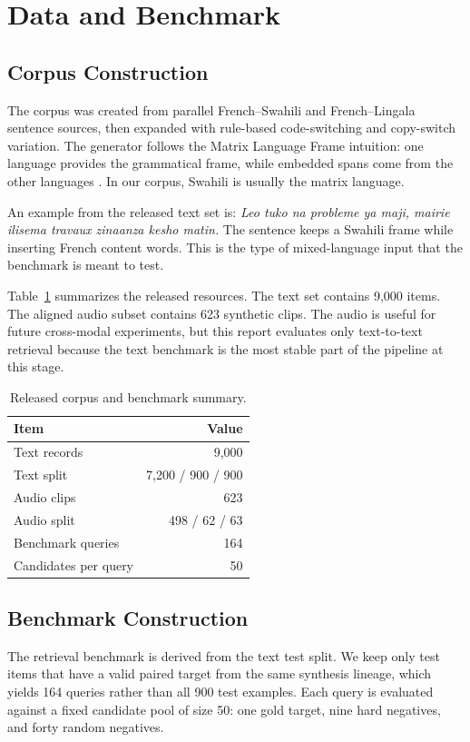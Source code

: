 \documentclass[11pt,twocolumn]{article}
\begin{document}
\section{Data and Benchmark}
\subsection{Corpus Construction}
The corpus was created from parallel French--Swahili and French--Lingala sentence sources, then expanded with rule-based code-switching and copy-switch variation. The generator follows the Matrix Language Frame intuition: one language provides the grammatical frame, while embedded spans come from the other languages \cite{myers-scotton1993}. In our corpus, Swahili is usually the matrix language.

An example from the released text set is: \emph{Leo tuko na probleme ya maji, mairie ilisema travaux zinaanza kesho matin.} The sentence keeps a Swahili frame while inserting French content words. This is the type of mixed-language input that the benchmark is meant to test.

Table~\ref{tab:data} summarizes the released resources. The text set contains 9{,}000 items. The aligned audio subset contains 623 synthetic clips. The audio is useful for future cross-modal experiments, but this report evaluates only text-to-text retrieval because the text benchmark is the most stable part of the pipeline at this stage.

\begin{table}[t]
\centering
\caption{Released corpus and benchmark summary.}
\label{tab:data}
\begin{tabular}{@{}lr@{}}
\toprule
Item & Value \\
\midrule
Text records & 9{,}000 \\
Text split & 7{,}200 / 900 / 900 \\
Audio clips & 623 \\
Audio split & 498 / 62 / 63 \\
Benchmark queries & 164 \\
Candidates per query & 50 \\
\bottomrule
\end{tabular}
\end{table}

\subsection{Benchmark Construction}
The retrieval benchmark is derived from the text test split. We keep only test items that have a valid paired target from the same synthesis lineage, which yields 164 queries rather than all 900 test examples. Each query is evaluated against a fixed candidate pool of size 50: one gold target, nine hard negatives, and forty random negatives.
\end{document}

